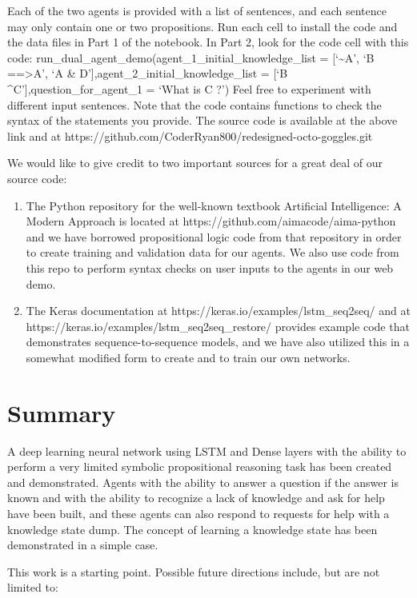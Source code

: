 \documentclass{article}
\begin{document}
Each of the two agents is provided with a list of sentences, and each sentence may only contain one or two propositions. Run each cell to install the code and the data files in Part 1 of the notebook. In Part 2, look for the code cell with this code:
run\_dual\_agent\_demo(agent\_1\_initial\_knowledge\_list = [‘\textasciitilde A’, ‘B ==\textgreater A’, ‘A \& D’],agent\_2\_initial\_knowledge\_list = [‘B \textasciicircum C’],question\_for\_agent\_1 = ‘What is C ?’)
Feel free to experiment with different input sentences. Note that the code contains functions to check the syntax of the statements you provide.
The source code is available at the above link and at https://github.com/CoderRyan800/redesigned-octo-goggles.git

We would like to give credit to two important sources for a great deal of our source code:
\begin{enumerate}
	\item The Python repository for the well-known textbook Artificial Intelligence: A Modern Approach is located at https://github.com/aimacode/aima-python and we have borrowed propositional logic code from that repository in order to create training and validation data for our agents. We also use code from this repo to perform syntax checks on user inputs to the agents in our web demo.
	\item The Keras documentation at https://keras.io/examples/lstm\_seq2seq/ and at https://keras.io/examples/lstm\_seq2seq\_restore/ provides example code that demonstrates sequence-to-sequence models, and we have also utilized this in a somewhat modified form to create and to train our own networks.
\end{enumerate}

\section{Summary}

A deep learning neural network using LSTM and Dense layers with the ability to perform a very limited symbolic propositional reasoning task has been created and demonstrated. Agents with the ability to answer a question if the answer is known and with the ability to recognize a lack of knowledge and ask for help have been built, and these agents can also respond to requests for help with a knowledge state dump. The concept of learning a knowledge state has been demonstrated in a simple case.

This work is a starting point. Possible future directions include, but are not limited to:
\end{document}

